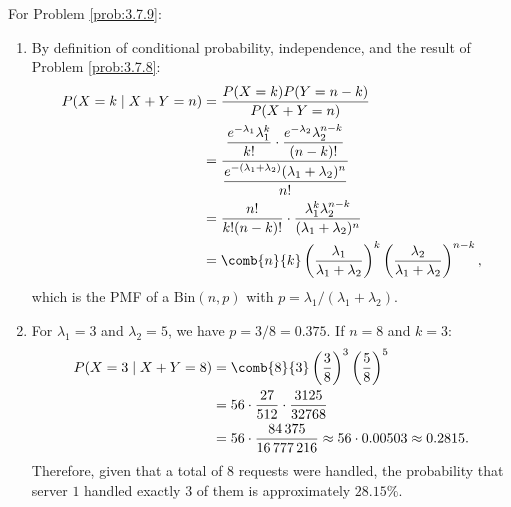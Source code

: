 \begin{solucion}
	\label{sol:3.7.9}
	For Problem \ref{prob:3.7.9}:
	\begin{enumerate}
		\item By definition of conditional probability, independence, and the result of Problem \ref{prob:3.7.8}:
		\begin{align*}
			P(X = k \mid X + Y = n) &= \dfrac{P(X = k) P(Y = n-k)}{P(X + Y = n)} \\
			&= \dfrac{\dfrac{e^{-\lambda_{1}} \lambda_{1}^{k}}{k!} \cdot \dfrac{e^{-\lambda_{2}} \lambda_{2}^{n-k}}{(n-k)!}}{\dfrac{e^{-(\lambda_{1}+\lambda_{2})} (\lambda_{1} + \lambda_{2})^{n}}{n!}} \\
			&= \dfrac{n!}{k! (n-k)!} \cdot \dfrac{\lambda_{1}^{k} \lambda_{2}^{n-k}}{(\lambda_{1} + \lambda_{2})^{n}} \\
			&= \comb{n}{k} \left(\dfrac{\lambda_{1}}{\lambda_{1} + \lambda_{2}}\right)^{k} \left(\dfrac{\lambda_{2}}{\lambda_{1} + \lambda_{2}}\right)^{n-k},
		\end{align*}
		which is the PMF of a $\text{Bin}(n, p)$ with $p = \lambda_{1}/(\lambda_{1} + \lambda_{2})$.
		\item For $\lambda_{1} = 3$ and $\lambda_{2} = 5$, we have $p = 3/8 = 0.375$. If $n = 8$ and $k = 3$:
		\begin{align*}
			P(X = 3 \mid X + Y = 8) &= \comb{8}{3} \left(\dfrac{3}{8}\right)^{3} \left(\dfrac{5}{8}\right)^{5} \\
			&= 56 \cdot \dfrac{27}{512} \cdot \dfrac{3125}{32768} \\
			&= 56 \cdot \dfrac{84\,375}{16\,777\,216} \approx 56 \cdot 0.00503 \approx 0.2815.
		\end{align*}
		Therefore, given that a total of $8$ requests were handled, the probability that server $1$ handled exactly $3$ of them is approximately $28.15\%$.
	\end{enumerate}
\end{solucion}

